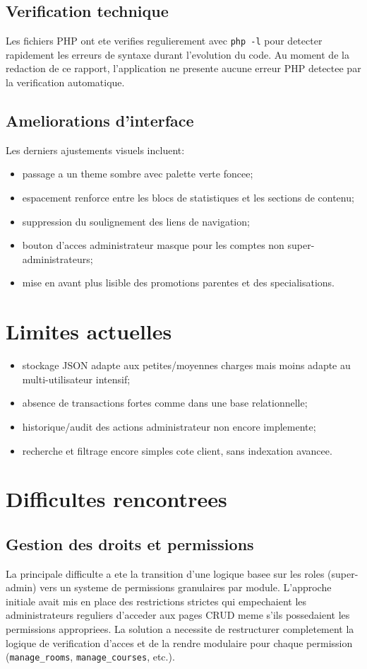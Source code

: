 \documentclass[12pt,a4paper]{article}
\begin{document}
\subsection{Verification technique}
Les fichiers PHP ont ete verifies regulierement avec \texttt{php -l} pour detecter rapidement les erreurs de syntaxe durant l'evolution du code.
Au moment de la redaction de ce rapport, l'application ne presente aucune erreur PHP detectee par la verification automatique.

\subsection{Ameliorations d'interface}
Les derniers ajustements visuels incluent:
\begin{itemize}[leftmargin=1.2cm]
    \item passage a un theme sombre avec palette verte foncee;
    \item espacement renforce entre les blocs de statistiques et les sections de contenu;
    \item suppression du soulignement des liens de navigation;
    \item bouton d'acces administrateur masque pour les comptes non super-administrateurs;
    \item mise en avant plus lisible des promotions parentes et des specialisations.
\end{itemize}

\section{Limites actuelles}
\begin{itemize}[leftmargin=1.2cm]
    \item stockage JSON adapte aux petites/moyennes charges mais moins adapte au multi-utilisateur intensif;
    \item absence de transactions fortes comme dans une base relationnelle;
    \item historique/audit des actions administrateur non encore implemente;
    \item recherche et filtrage encore simples cote client, sans indexation avancee.
\end{itemize}

\section{Difficultes rencontrees}
\subsection{Gestion des droits et permissions}
La principale difficulte a ete la transition d'une logique basee sur les roles (super-admin) vers un systeme de permissions granulaires par module.
L'approche initiale avait mis en place des restrictions strictes qui empechaient les administrateurs reguliers d'acceder aux pages CRUD meme s'ils possedaient les permissions appropriees.
La solution a necessite de restructurer completement la logique de verification d'acces et de la rendre modulaire pour chaque permission (\texttt{manage\_rooms}, \texttt{manage\_courses}, etc.).
\end{document}
